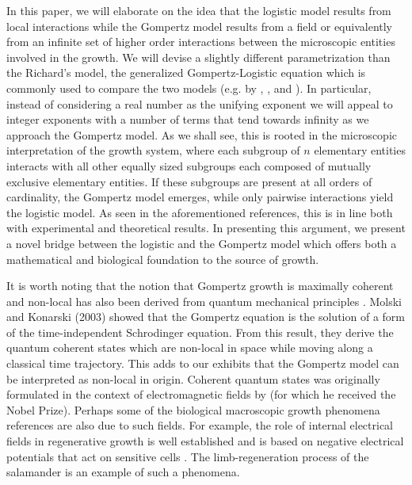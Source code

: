 \documentclass{article}
\begin{document}
In this paper, we will elaborate on the idea that the logistic model results from local interactions while the Gompertz model results from a field or equivalently from an infinite set of higher order interactions between the microscopic entities involved in the growth. We will devise a slightly different parametrization than the Richard's model, the generalized Gompertz-Logistic equation which is commonly used to compare the two models (e.g. by \citet{petroni2020logistic}, \citet{tjorve2017use}, and \citet{wang2012richards}). In particular, instead of considering a real number as the unifying exponent we will appeal to integer exponents with a number of terms that tend towards infinity as we approach the Gompertz model. As we shall see, this is rooted in the microscopic interpretation of the growth system, where each subgroup of $n$ elementary entities interacts with all other equally sized subgroups each composed of mutually exclusive elementary entities. If these subgroups are present at all orders of cardinality, the Gompertz model emerges, while only pairwise interactions yield the logistic model. As seen in the aforementioned references, this is in line both with experimental and theoretical results. In presenting this argument, we present a novel bridge between the logistic and the Gompertz model which offers both a mathematical and biological foundation to the source of growth.

It is worth noting that the notion that Gompertz growth is maximally coherent and non-local has also been derived from quantum mechanical principles \cite{molski2003coherent}. Molski and Konarski (2003) showed that the Gompertz equation is the solution of a form of the time-independent Schrodinger equation. From this result, they derive the quantum coherent states which are non-local in space while moving along a classical time trajectory. This adds to our exhibits that the Gompertz model can be interpreted as non-local in origin. Coherent quantum states was originally formulated in the context of electromagnetic fields by \citet{glauber1963coherent} (for which he received the Nobel Prize). Perhaps some of the biological macroscopic growth phenomena references are also due to such fields. For example, the role of internal electrical fields in regenerative growth is well established and is based on negative electrical potentials that act on sensitive cells \cite{becker1984electromagnetic}. The limb-regeneration process of the salamander is an example of such a phenomena. 
\end{document}
